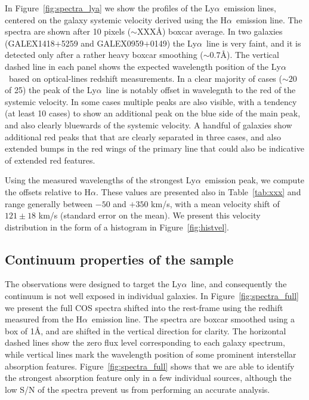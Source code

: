 \documentclass[manuscript]{emulateapj}
\newcommand{\lya}{Ly$\alpha$}
\newcommand{\ha}{H$\alpha$}
\begin{document}
In Figure~\ref{fig:spectra_lya} we show the profiles of the \lya\
emission lines, centered on the galaxy systemic velocity derived using
the \ha\ emission line. The spectra are shown after 10 pixels ($\sim
$XXX\AA) boxcar average. In two galaxies (GALEX1418$+$5259 and
GALEX0959$+$0149) the \lya\ line is very faint, and it is detected
only after a rather heavy boxcar smoothing ($\sim 0.7$\AA).  The
vertical dashed line in each panel shows the expected wavelength
position of the \lya\ based on optical-lines redshift measurements.
In a clear majority of cases ($\sim 20$ of 25) the peak of the \lya\
line is notably offset in wavelegnth to the red of the systemic
velocity. In some cases multiple peaks are also visible, with a
tendency (at least 10 cases) to show an additional peak on the blue
side of the main peak, and also clearly bluewards of the systemic
velocity. A handful of galaxies show additional red peaks that that
are clearly separated in three cases, and also extended bumps in the
red wings of the primary line that could also be indicative of
extended red features.

Using the measured wavelengths of the strongest \lya\ emission peak,
we compute the offsets relative to \ha. These values are presented
also in Table~\ref{tab:xxx} and range generally between $-50$ and
$+350$ km/s, with a mean velocity shift of $121\pm 18$ km/s (standard
error on the mean). We present this velocity distribution in the form
of a histogram in Figure~\ref{fig:histvel}.

\subsection{Continuum properties of the sample}
The observations were designed to target the \lya\ line, and
consequently the continuum is not well exposed in individual galaxies.
In Figure~\ref{fig:spectra_full} we present the full COS spectra
shifted into the rest-frame using the redhift measured from the \ha\
emission line. The spectra are boxcar smoothed using a box of 1\AA,
and are shifted in the vertical direction for clarity.  The horizontal
dashed lines show the zero flux level corresponding to each galaxy
spectrum, while vertical lines mark the wavelength position of some
prominent interstellar absorption
features. Figure~\ref{fig:spectra_full} shows that we are able to
identify the strongest absorption feature only in a few individual
sources, although the low S/N of the spectra prevent us from performing
an accurate analysis.
\end{document}
